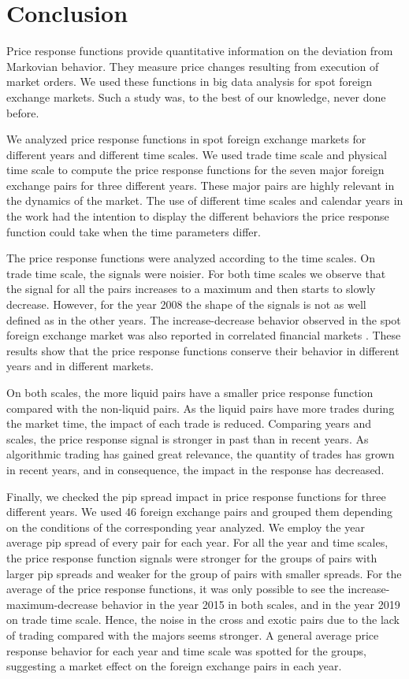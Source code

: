 \section{Conclusion}\label{sec:conclusion}

Price response functions provide quantitative information on the deviation from
Markovian behavior. They measure price changes resulting from execution of
market orders. We used these functions in big data analysis for spot foreign
exchange markets. Such a study was, to the best of our knowledge, never done
before.

We analyzed price response functions in spot foreign exchange markets for
different years and different time scales. We used trade time scale and
physical time scale to compute the price response functions for the seven major
foreign exchange pairs for three different years. These major pairs are highly
relevant in the dynamics of the market. The use of different time scales and
calendar years in the work had the intention to display the different behaviors
the price response function could take when the time parameters differ.

The price response functions were analyzed according to the time scales. On
trade time scale, the signals were noisier. For both time scales we observe
that the signal for all the pairs increases to a maximum and then starts to
slowly decrease. However, for the year 2008 the shape of the signals is not as
well defined as in the other years. The increase-decrease behavior observed in
the spot foreign exchange market was also reported in correlated financial
markets \cite{my_paper_response_financial,Wang_2016_avg}. These results show
that the price response functions conserve their behavior in different years
and in different markets.

On both scales, the more liquid pairs have a smaller price response function
compared with the non-liquid pairs. As the liquid pairs have more trades during
the market time, the impact of each trade is reduced. Comparing years and
scales, the price response signal is stronger in past than in recent years. As
algorithmic trading has gained great relevance, the quantity of trades has
grown in recent years, and in consequence, the impact in the response has
decreased.

Finally, we checked the pip spread impact in price response functions for three
different years. We used 46 foreign exchange pairs and grouped them depending
on the conditions of the corresponding year analyzed. We employ the year
average pip spread of every pair for each year. For all the year and time
scales, the price response function signals were stronger for the groups of
pairs with larger pip spreads and weaker for the group of pairs with smaller
spreads. For the average of the price response functions, it was only possible
to see the increase-maximum-decrease behavior in the year 2015 in both scales,
and in the year 2019 on trade time scale. Hence, the noise in the cross and
exotic pairs due to the lack of trading compared with the majors seems
stronger. A general average price response behavior for each year and time
scale was spotted for the groups, suggesting a market effect on the foreign
exchange pairs in each year.


